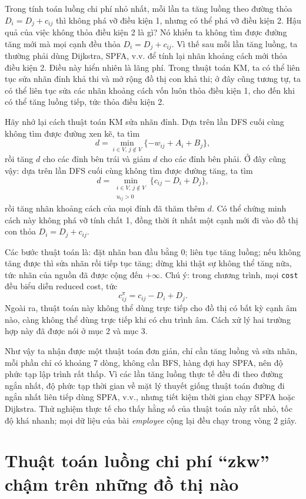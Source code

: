 \documentclass[11pt]{article}
\begin{document}
Trong tính toán luồng chi phí nhỏ nhất, mỗi lần ta tăng luồng theo đường thỏa
$D_i=D_j+c_{ij}$ thì không phá vỡ điều kiện 1, nhưng có thể phá vỡ điều kiện
2. Hậu quả của việc không thỏa điều kiện 2 là gì? Nó khiến ta không tìm được
đường tăng mới mà mọi cạnh đều thỏa $D_i=D_j+c_{ij}$. Vì thế sau mỗi lần tăng
luồng, ta thường phải dùng Dijkstra, SPFA, v.v. để tính lại nhãn khoảng cách
mới thỏa điều kiện 2. Điều này hiển nhiên là lãng phí. Trong thuật toán KM, ta
có thể liên tục sửa nhãn đỉnh khả thi và mở rộng đồ thị con khả thi; ở đây
cũng tương tự, ta có thể liên tục sửa các nhãn khoảng cách vốn luôn thỏa điều
kiện 1, cho đến khi có thể tăng luồng tiếp, tức thỏa điều kiện 2.

Hãy nhớ lại cách thuật toán KM sửa nhãn đỉnh. Dựa trên lần DFS cuối cùng không
tìm được đường xen kẽ, ta tìm
\[
  d=\min_{i\in V,\,j\notin V}\{-w_{ij}+A_i+B_j\},
\]
rồi tăng $d$ cho các đỉnh bên trái và giảm $d$ cho các đỉnh bên phải. Ở đây
cũng vậy: dựa trên lần DFS cuối cùng không tìm được đường tăng, ta tìm
\[
  d=\min_{\substack{i\in V,\,j\notin V\\ u_{ij}>0}}
    \{c_{ij}-D_i+D_j\},
\]
rồi tăng nhãn khoảng cách của mọi đỉnh đã thăm thêm $d$. Có thể chứng minh
cách này không phá vỡ tính chất 1, đồng thời ít nhất một cạnh mới đi vào đồ
thị con thỏa $D_i=D_j+c_{ij}$.

Các bước thuật toán là: đặt nhãn ban đầu bằng $0$; liên tục tăng luồng; nếu
không tăng được thì sửa nhãn rồi tiếp tục tăng; dừng khi thật sự không thể
tăng nữa, tức nhãn của nguồn đã được cộng đến $+\infty$. Chú ý: trong chương
trình, mọi \texttt{cost} đều biểu diễn reduced cost, tức
\[
  c^\pi_{ij}=c_{ij}-D_i+D_j.
\]
Ngoài ra, thuật toán này không thể dùng trực tiếp cho đồ thị có bất kỳ cạnh
âm nào, càng không thể dùng trực tiếp khi có chu trình âm. Cách xử lý hai
trường hợp này đã được nói ở mục 2 và mục 3.

Như vậy ta nhận được một thuật toán đơn giản, chỉ cần tăng luồng và sửa nhãn,
mỗi phần chỉ có khoảng $7$ dòng, không cần BFS, hàng đợi hay SPFA, nên độ phức
tạp lập trình rất thấp. Vì các lần tăng luồng thực tế đều đi theo đường ngắn
nhất, độ phức tạp thời gian về mặt lý thuyết giống thuật toán đường đi ngắn
nhất liên tiếp dùng SPFA, v.v., nhưng tiết kiệm thời gian chạy SPFA hoặc
Dijkstra. Thử nghiệm thực tế cho thấy hằng số của thuật toán này rất nhỏ, tốc
độ khá nhanh; mọi dữ liệu của bài \textit{employee} cộng lại đều chạy trong
vòng $2$ giây.

\section{Thuật toán luồng chi phí ``zkw'' chậm trên những đồ thị nào}
\end{document}
